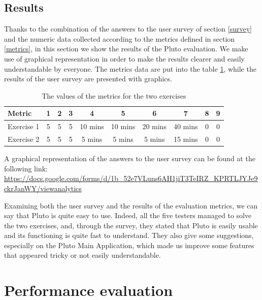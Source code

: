 \subsection{Results}\label{surveyResult}

Thanks to the combination of the answers to the user survey of section \ref{survey} and the numeric data collected according to the metrics defined in section \ref{metrics}, in this section we show the results of the Pluto evaluation.
We make use of graphical representation in order to make the results clearer and easily understandable by everyone.
The metrics data are put into the table \ref{surveyTable}, while the results of the user survey are presented with graphics.
\\

\begin{table} [htdp]
\centering
\caption{The values of the metrics for the two exercises}
\label{surveyTable}
    \begin{tabular}{|l|c|c|c|c|c|c|c|c|c|}
    \hline
    Metric & 1 & 2 & 3 &  4 &  5 & 6 &  7 & 8 & 9\\ \hline
    Exercise 1 & 5 & 5 & 5 & 10 mins & 10 mins & 20 mins & 40 mins & 0 & 0 \\ \hline
    Exercise 2 & 5 & 5 & 5 & 5 mins & 5 mins & 5 mins & 15 mins & 0 & 0
     \\ \hline
     \end{tabular}
    \end{table}


A graphical representation of the answers to the user survey can be found at the following link:
\\

\url{https://docs.google.com/forms/d/1b_52e7VLuns6AH1jiT3TeIRZ_KPRTLJYJe9ckrJanWY/viewanalytics}
\newpage

Examining both the user survey and the results of the evaluation metrics, we can say that Pluto is quite easy to use.
Indeed, all the five testers managed to solve the two exercises, and, through the survey, they stated that Pluto is easily usable and its functioning is quite fast to understand.
They also give some suggestions, especially on the Pluto Main Application, which made us improve some features that appeared tricky or not easily understandable.


\newpage

\section{Performance evaluation}\label{performance}

